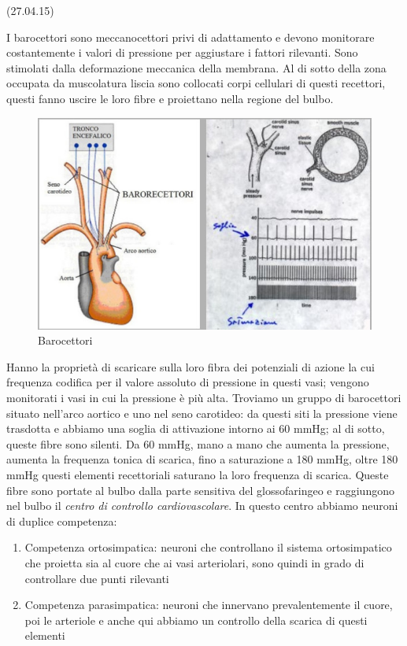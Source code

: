 \documentclass[a4paper,12pt]{article}
\begin{document}
(27.04.15)

I barocettori sono meccanocettori privi di adattamento e devono monitorare costantemente i valori di pressione per aggiustare i fattori rilevanti. Sono stimolati dalla deformazione meccanica della membrana. Al di sotto della zona occupata da muscolatura liscia sono collocati corpi cellulari di questi recettori, questi fanno uscire le loro fibre e proiettano nella regione del bulbo.
\begin{figure}[H]
\centering
\includegraphics[scale=0.35]{immagine/baro.jpg}
\caption{Barocettori}
\end{figure}

Hanno la proprietà di scaricare sulla loro fibra dei potenziali di azione la cui frequenza codifica per il valore assoluto di pressione in questi vasi; vengono monitorati i vasi in cui la pressione è più alta. Troviamo un gruppo di barocettori situato nell'arco aortico e uno nel seno carotideo: da questi siti la pressione viene trasdotta e abbiamo una soglia di attivazione intorno ai 60 mmHg; al di sotto, queste fibre sono silenti. Da 60 mmHg, mano a mano che aumenta la pressione, aumenta la frequenza tonica di scarica, fino a saturazione a 180 mmHg, oltre 180 mmHg questi elementi recettoriali saturano la loro frequenza di scarica. Queste fibre sono portate al bulbo dalla parte sensitiva del glossofaringeo e raggiungono nel bulbo il \emph{centro di controllo cardiovascolare}. In questo centro abbiamo neuroni di duplice competenza:
\begin{enumerate}
\item{Competenza ortosimpatica: neuroni che controllano il sistema ortosimpatico che proietta sia al cuore che ai vasi arteriolari, sono quindi in grado di controllare due punti rilevanti}
\item{Competenza parasimpatica: neuroni che innervano prevalentemente il cuore, poi le arteriole e anche qui abbiamo un controllo della scarica di questi elementi}
\end{enumerate}
\end{document}
